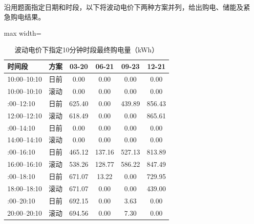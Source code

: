 \documentclass[UTF8,a4paper,zihao=-4,fontset=windows]{ctexart}
\begin{document}
沿用题面指定日期和时段，以下将波动电价下两种方案并列，给出购电、储能及紧急购电结果。
\par
\begin{table}[H]\centering
\fontsize{9.5}{12}\selectfont\setlength{\tabcolsep}{4pt}\renewcommand{\arraystretch}{1.12}
\begin{adjustbox}{max width=\linewidth}\begin{tabular}{lccccc}\toprule
\textbf{时间段} & \textbf{方案} & \textbf{03-20} & \textbf{06-21} & \textbf{09-23} & \textbf{12-21}\\\midrule
10:00–10:10 & 日前 & 0.00 & 0.00 & 0.00 & 0.00\\
10:00–10:10 & 滚动 & 0.00 & 0.00 & 0.00 & 0.00\\
\addlinespace[2pt]
12:00–12:10 & 日前 & 625.40 & 0.00 & 439.89 & 856.43\\
12:00–12:10 & 滚动 & 618.49 & 0.00 & 0.00 & 865.61\\
\addlinespace[2pt]
14:00–14:10 & 日前 & 0.00 & 0.00 & 0.00 & 0.00\\
14:00–14:10 & 滚动 & 0.00 & 0.00 & 0.00 & 0.00\\
\addlinespace[2pt]
16:00–16:10 & 日前 & 465.12 & 137.16 & 527.13 & 813.89\\
16:00–16:10 & 滚动 & 538.26 & 128.77 & 586.22 & 847.49\\
\addlinespace[2pt]
18:00–18:10 & 日前 & 671.07 & 13.22 & 0.00 & 729.95\\
18:00–18:10 & 滚动 & 671.07 & 0.00 & 0.00 & 439.00\\
\addlinespace[2pt]
20:00–20:10 & 日前 & 692.15 & 0.00 & 3.63 & 0.00\\
20:00–20:10 & 滚动 & 694.56 & 0.00 & 7.30 & 0.00\\
\bottomrule\end{tabular}\end{adjustbox}
\caption{波动电价下指定10分钟时段最终购电量（kWh）}
\end{table}
\end{document}
